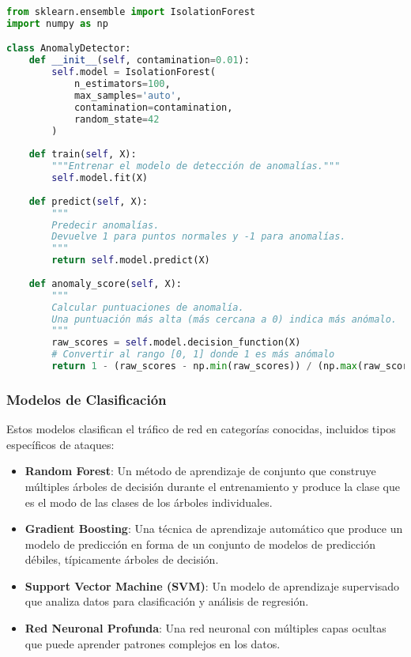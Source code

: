 \begin{lstlisting}[language=Python, caption=Implementación de Isolation Forest]
from sklearn.ensemble import IsolationForest
import numpy as np

class AnomalyDetector:
    def __init__(self, contamination=0.01):
        self.model = IsolationForest(
            n_estimators=100,
            max_samples='auto',
            contamination=contamination,
            random_state=42
        )
        
    def train(self, X):
        """Entrenar el modelo de detección de anomalías."""
        self.model.fit(X)
        
    def predict(self, X):
        """
        Predecir anomalías.
        Devuelve 1 para puntos normales y -1 para anomalías.
        """
        return self.model.predict(X)
        
    def anomaly_score(self, X):
        """
        Calcular puntuaciones de anomalía.
        Una puntuación más alta (más cercana a 0) indica más anómalo.
        """
        raw_scores = self.model.decision_function(X)
        # Convertir al rango [0, 1] donde 1 es más anómalo
        return 1 - (raw_scores - np.min(raw_scores)) / (np.max(raw_scores) - np.min(raw_scores))
\end{lstlisting}

\subsubsection{Modelos de Clasificación}
Estos modelos clasifican el tráfico de red en categorías conocidas, incluidos tipos específicos de ataques:

\begin{itemize}
    \item \textbf{Random Forest}: Un método de aprendizaje de conjunto que construye múltiples árboles de decisión durante el entrenamiento y produce la clase que es el modo de las clases de los árboles individuales.
    
    \item \textbf{Gradient Boosting}: Una técnica de aprendizaje automático que produce un modelo de predicción en forma de un conjunto de modelos de predicción débiles, típicamente árboles de decisión.
    
    \item \textbf{Support Vector Machine (SVM)}: Un modelo de aprendizaje supervisado que analiza datos para clasificación y análisis de regresión.
    
    \item \textbf{Red Neuronal Profunda}: Una red neuronal con múltiples capas ocultas que puede aprender patrones complejos en los datos.
\end{itemize}


